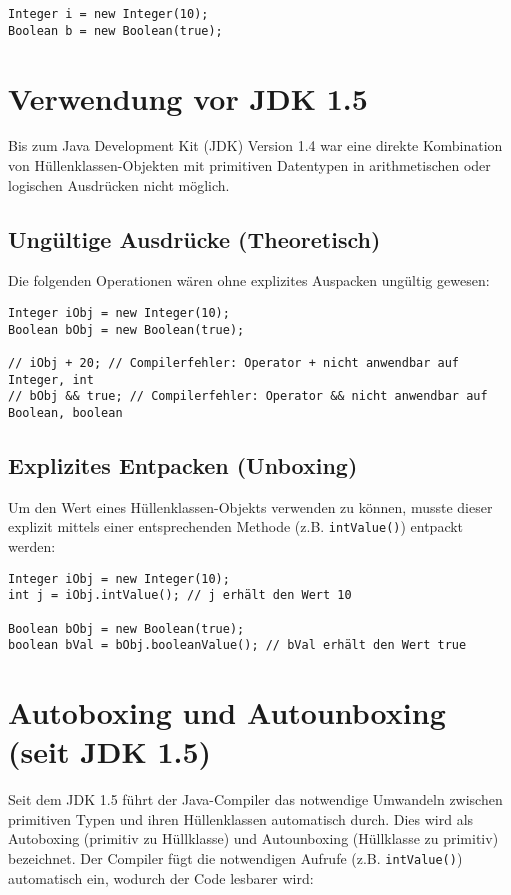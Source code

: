 \begin{lstlisting}[caption={Erstellung von Hüllenklassen-Objekten}]
Integer i = new Integer(10);
Boolean b = new Boolean(true);
\end{lstlisting}

\section{Verwendung vor JDK 1.5}
\label{sec:verwendung_vor_jdk1_5}
Bis zum Java Development Kit (JDK) Version 1.4 war eine direkte Kombination von Hüllenklassen-Objekten mit primitiven Datentypen in arithmetischen oder logischen Ausdrücken nicht möglich.

\subsection{Ungültige Ausdrücke (Theoretisch)}
\label{ssec:ungueltige_ausdruecke_vor_jdk1_5}
Die folgenden Operationen wären ohne explizites Auspacken ungültig gewesen:
\begin{lstlisting}[caption={Theoretisch ungültige Ausdrücke vor JDK 1.5}]
Integer iObj = new Integer(10);
Boolean bObj = new Boolean(true);

// iObj + 20; // Compilerfehler: Operator + nicht anwendbar auf Integer, int
// bObj && true; // Compilerfehler: Operator && nicht anwendbar auf Boolean, boolean
\end{lstlisting}

\subsection{Explizites Entpacken (Unboxing)}
\label{ssec:explizites_entpacken}
Um den Wert eines Hüllenklassen-Objekts verwenden zu können, musste dieser explizit mittels einer entsprechenden Methode (z.B. \texttt{intValue()}) entpackt werden:
\begin{lstlisting}[caption={Explizites Entpacken des Wertes}]
Integer iObj = new Integer(10);
int j = iObj.intValue(); // j erhält den Wert 10

Boolean bObj = new Boolean(true);
boolean bVal = bObj.booleanValue(); // bVal erhält den Wert true
\end{lstlisting}

\section{Autoboxing und Autounboxing (seit JDK 1.5)}
\label{sec:autoboxing_autounboxing}
Seit dem JDK 1.5 führt der Java-Compiler das notwendige Umwandeln zwischen primitiven Typen und ihren Hüllenklassen automatisch durch. Dies wird als Autoboxing (primitiv zu Hüllklasse) und Autounboxing (Hüllklasse zu primitiv) bezeichnet.
Der Compiler fügt die notwendigen Aufrufe (z.B. \texttt{intValue()}) automatisch ein, wodurch der Code lesbarer wird:

